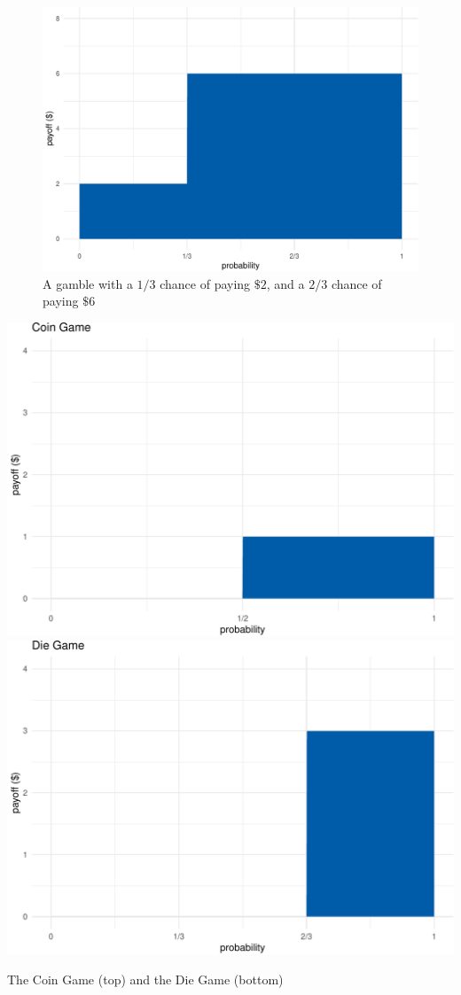 \documentclass[justified]{tufte-book}
\theoremstyle{definition}
\theoremstyle{definition}
\theoremstyle{definition}
\theoremstyle{definition}
\theoremstyle{remark}
\begin{document}
\begin{figure}
\includegraphics{_main_files/figure-latex/gambleviz-1} \caption[A gamble with a $1/3$ chance of paying $\$2$, and a $2/3$ chance of paying $\$6$]{A gamble with a $1/3$ chance of paying $\$2$, and a $2/3$ chance of paying $\$6$}\label{fig:gambleviz}
\end{figure}
\begin{marginfigure}
\includegraphics{_main_files/figure-latex/coindiegame-1} \includegraphics{_main_files/figure-latex/coindiegame-2} \caption[The Coin Game (top) and the Die Game (bottom)]{The Coin Game (top) and the Die Game (bottom)}\label{fig:coindiegame}
\end{marginfigure}
\end{document}
